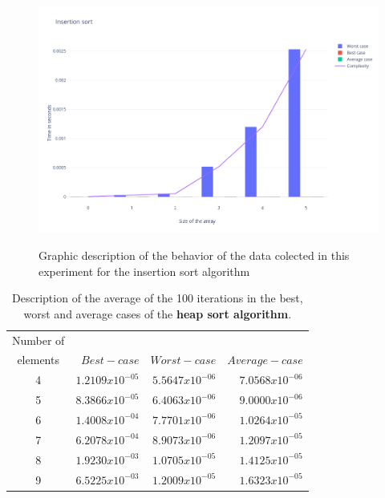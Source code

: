 \documentclass{article}
\begin{document}
\begin{figure}[htp]
	\centering
		\caption{Graphic description of the behavior of the data colected in this experiment for the insertion sort algorithm}
	\includegraphics[width=\linewidth]{Insertionsort.png}
	\label{ima3}
\end{figure}

     \begin{table}[h!]
\centering
 \caption{Description of the average of the 100 iterations in the best, worst and average cases of the \textbf{heap sort algorithm}. } 
 \label{ta6}
 \begin{tabular} {| c | r | r | r | }
 \hline

Number of 	&		&		&		\\
 elements	&		$	Best-case	$	&	$	Worst-case	$	&	$	Average -case	$	\\
 \hline
4	&	$	1.2109x10^{-05}	$	&	$	5.5647x10^{-06}	$	&	$	7.0568x10^{-06}	$	\\
 \hline
5	&	$	8.3866x10^{-05}	$	&	$	6.4063x10^{-06}	$	&	$	9.0000x10^{-06}	$	\\
 \hline
6	&	$	1.4008x10^{-04}	$	&	$	7.7701x10^{-06}	$	&	$	1.0264x10^{-05}	$	\\
 \hline
7	&	$	6.2078x10^{-04}	$	&	$	8.9073x10^{-06}	$	&	$	1.2097x10^{-05}	$	\\
 \hline
8	&	$	1.9230x10^{-03}	$	&	$	1.0705x10^{-05}	$	&	$	1.4125x10^{-05}	$	\\
 \hline
9	&	$	6.5225x10^{-03}	$	&	$	1.2009x10^{-05}	$	&	$	1.6323x10^{-05}	$	\\
\hline
 \end{tabular}
 \end{table}
\end{document}
